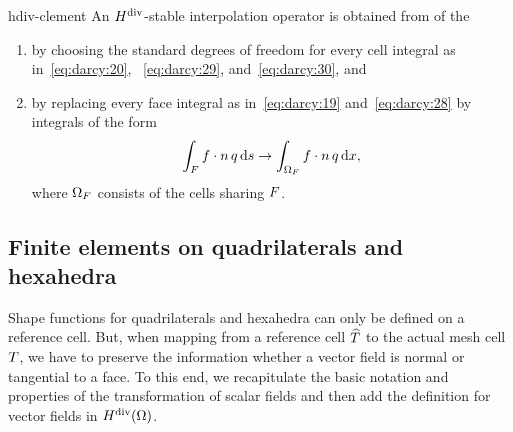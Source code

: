 \begin{Definition}{hdiv-clement}
  An $H^{\text{div}}$-stable interpolation operator is obtained from
   of the
  \begin{enumerate}
  \item by choosing the standard degrees of freedom for every cell
    integral as in~\eqref{eq:darcy:20}, ~\eqref{eq:darcy:29},
    and~\eqref{eq:darcy:30}, and
  \item by replacing every face integral as in~\eqref{eq:darcy:19}
    and~\eqref{eq:darcy:28} by integrals of the form
    \begin{gather}
      \int_{F} f\cdot n \,q \,\mathrm{d} s
      \to
      \int_{\Omega_F} f\cdot n \,q \,\mathrm{d} x,
    \end{gather}
    where $\Omega_F$ consists of the cells sharing $F$.
  \end{enumerate}
\end{Definition}

\subsection{Finite elements on quadrilaterals and hexahedra}

\begin{intro}
  Shape functions for quadrilaterals and hexahedra can only be defined
  on a reference cell. But, when mapping from a reference cell
  $\widehat {T}$ to the actual mesh cell $T$, we have to preserve the
  information whether a vector field is normal or tangential to a
  face. To this end, we recapitulate the basic notation and properties
  of the transformation of scalar fields and then add the definition
  for vector fields in $H^{\text{div}}(\Omega)$.
\end{intro}

